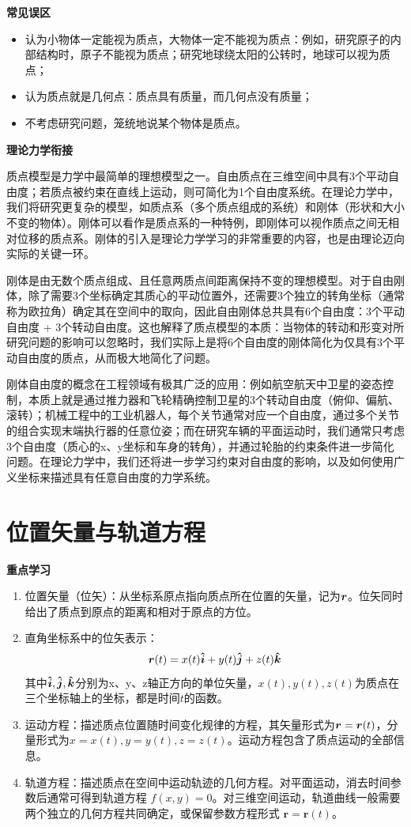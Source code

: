 \textbf{常见误区}
\begin{itemize}
\item 认为小物体一定能视为质点，大物体一定不能视为质点：例如，研究原子的内部结构时，原子不能视为质点；研究地球绕太阳的公转时，地球可以视为质点；
\item 认为质点就是几何点：质点具有质量，而几何点没有质量；
\item 不考虑研究问题，笼统地说某个物体是质点。
\end{itemize}

\textbf{理论力学衔接}


质点模型是力学中最简单的理想模型之一。自由质点在三维空间中具有3个平动自由度；若质点被约束在直线上运动，则可简化为1个自由度系统。在理论力学中，我们将研究更复杂的模型，如质点系（多个质点组成的系统）和刚体（形状和大小不变的物体）。刚体可以看作是质点系的一种特例，即刚体可以视作质点之间无相对位移的质点系。刚体的引入是理论力学学习的非常重要的内容，也是由理论迈向实际的关键一环。

刚体是由无数个质点组成、且任意两质点间距离保持不变的理想模型。对于自由刚体，除了需要3个坐标确定其质心的平动位置外，还需要3个独立的转角坐标（通常称为欧拉角）确定其在空间中的取向，因此自由刚体总共具有6个自由度：3个平动自由度 + 3个转动自由度。这也解释了质点模型的本质：当物体的转动和形变对所研究问题的影响可以忽略时，我们实际上是将6个自由度的刚体简化为仅具有3个平动自由度的质点，从而极大地简化了问题。

刚体自由度的概念在工程领域有极其广泛的应用：例如航空航天中卫星的姿态控制，本质上就是通过推力器和飞轮精确控制卫星的3个转动自由度（俯仰、偏航、滚转）；机械工程中的工业机器人，每个关节通常对应一个自由度，通过多个关节的组合实现末端执行器的任意位姿；而在研究车辆的平面运动时，我们通常只考虑3个自由度（质心的x、y坐标和车身的转角），并通过轮胎的约束条件进一步简化问题。在理论力学中，我们还将进一步学习约束对自由度的影响，以及如何使用广义坐标来描述具有任意自由度的力学系统。

\newpage

\section{位置矢量与轨道方程}
\textbf{重点学习}
\begin{enumerate}[label=\arabic*.]
\item 位置矢量（位矢）：从坐标系原点指向质点所在位置的矢量，记为$\boldsymbol{r}$。位矢同时给出了质点到原点的距离和相对于原点的方位。
\item 直角坐标系中的位矢表示：
\[
\boldsymbol{r}(t) = x(t)\boldsymbol{\hat{i}} + y(t)\boldsymbol{\hat{j}} + z(t)\boldsymbol{\hat{k}}
\]
其中$\boldsymbol{\hat{i}},\boldsymbol{\hat{j}},\boldsymbol{\hat{k}}$分别为x、y、z轴正方向的单位矢量，$x(t),y(t),z(t)$为质点在三个坐标轴上的坐标，都是时间$t$的函数。
\item 运动方程：描述质点位置随时间变化规律的方程，其矢量形式为$\boldsymbol{r}=\boldsymbol{r}(t)$，分量形式为$x=x(t),y=y(t),z=z(t)$。运动方程包含了质点运动的全部信息。
\item 轨道方程：描述质点在空间中运动轨迹的几何方程。对平面运动，消去时间参数后通常可得到轨道方程 $f(x,y)=0$。对三维空间运动，轨道曲线一般需要两个独立的几何方程共同确定，或保留参数方程形式 $\mathbf r=\mathbf r(t)$。
\end{enumerate}

